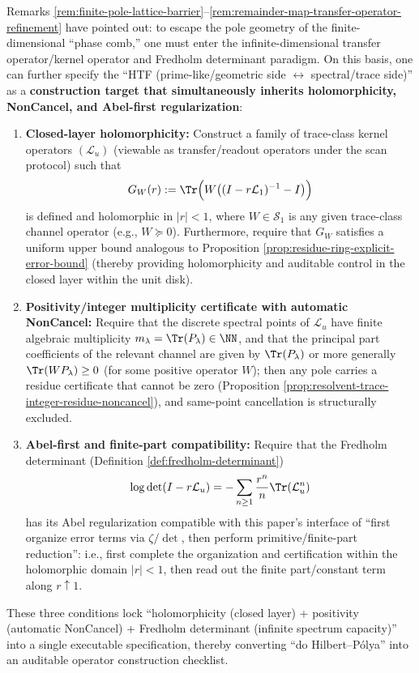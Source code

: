 \begin{remark}\label{rem:positive-fredholm-htf}
Remarks \ref{rem:finite-pole-lattice-barrier}--\ref{rem:remainder-map-transfer-operator-refinement} have pointed out: to escape the pole geometry of the finite-dimensional ``phase comb,'' one must enter the infinite-dimensional transfer operator/kernel operator and Fredholm determinant paradigm.
On this basis, one can further specify the ``HTF (prime-like/geometric side \(\leftrightarrow\) spectral/trace side)'' as a \textbf{construction target that simultaneously inherits holomorphicity, NonCancel, and Abel-first regularization}:
\begin{enumerate}
  \item \textbf{Closed-layer holomorphicity:} Construct a family of trace-class kernel operators \((\mathcal{L}_u)\) (viewable as transfer/readout operators under the scan protocol) such that
  \[
  G_W(r):=\Tr\Bigl(W\bigl((I-r\mathcal{L}_1)^{-1}-I\bigr)\Bigr)
  \]
  is defined and holomorphic in \(|r|<1\), where \(W\in\mathcal{S}_1\) is any given trace-class channel operator (e.g., \(W\succeq 0\)). Furthermore, require that \(G_W\) satisfies a uniform upper bound analogous to Proposition \ref{prop:residue-ring-explicit-error-bound} (thereby providing holomorphicity and auditable control in the closed layer within the unit disk).
  \item \textbf{Positivity/integer multiplicity certificate with automatic NonCancel:} Require that the discrete spectral points of \(\mathcal{L}_u\) have finite algebraic multiplicity \(m_\lambda=\Tr(P_\lambda)\in\NN\), and that the principal part coefficients of the relevant channel are given by \(\Tr(P_\lambda)\) or more generally \(\Tr(WP_\lambda)\ge 0\) (for some positive operator \(W\)); then any pole carries a residue certificate that cannot be zero (Proposition \ref{prop:resolvent-trace-integer-residue-noncancel}), and same-point cancellation is structurally excluded.
  \item \textbf{Abel-first and finite-part compatibility:} Require that the Fredholm determinant (Definition \ref{def:fredholm-determinant})
  \[
  \log\det(I-r\mathcal{L}_u)=-\sum_{n\ge 1}\frac{r^n}{n}\Tr(\mathcal{L}_u^n)
  \]
  has its Abel regularization compatible with this paper's interface of ``first organize error terms via \(\zeta/\det\), then perform primitive/finite-part reduction'': i.e., first complete the organization and certification within the holomorphic domain \(|r|<1\), then read out the finite part/constant term along \(r\uparrow 1\).
\end{enumerate}
These three conditions lock ``holomorphicity (closed layer) + positivity (automatic NonCancel) + Fredholm determinant (infinite spectrum capacity)'' into a single executable specification, thereby converting ``do Hilbert--P{\'o}lya'' into an auditable operator construction checklist.
\end{remark}

